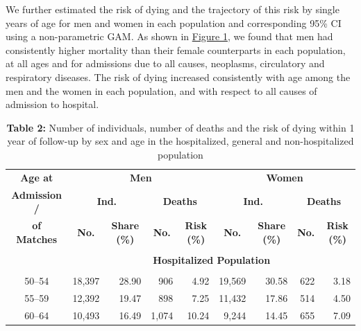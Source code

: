 We further estimated the risk of dying and the trajectory of this risk by 
single years of age for men and women in each population and corresponding 
95\% CI using a non-parametric GAM. As shown in \hyperref[ch2:fig1]{Figure 1}, 
we found that men had consistently higher mortality than their female counterparts 
in each population, at all ages and for admissions due to all causes, 
neoplasms, circulatory and respiratory diseases. The risk of dying increased 
consistently with age among the men and the women in each population, 
and with respect to all causes of admission to hospital.

\begin{landscape}

\begin{table}[H]
  \scriptsize
  \centering
  \caption*{\textbf{Table 2: }  Number of individuals, number of deaths 
  			and the risk of dying within 1 year of follow-up by sex and 
  			age in the hospitalized, general and non-hospitalized population}
    \begin{tabular}{ccccccccc}
    \toprule
    \textbf{Age at } & \multicolumn{4}{c}{\textbf{Men}} & \multicolumn{4}{c}{\textbf{Women}} \\
    \textbf{Admission /} & \multicolumn{2}{c}{\textbf{Ind.}} & \multicolumn{2}{c}{\textbf{Deaths}} & \multicolumn{2}{c}{\textbf{Ind.}} & \multicolumn{2}{c}{\textbf{Deaths}} \\
    \textbf{of Matches} & \textbf{No.} & \textbf{Share (\%)} & \textbf{No.} & \textbf{Risk (\%)} & \textbf{No.} & \textbf{Share (\%)} & \textbf{No.} & \textbf{Risk (\%)} \\
    \midrule
          &       &       &       &       &       &       &       &  \\
          & \multicolumn{8}{c}{\textbf{Hospitalized Population}} \\
          &       &       &       &       &       &       &       &  \\
    50--54 & \multicolumn{1}{r}{18,397} & \multicolumn{1}{r}{28.90} & \multicolumn{1}{r}{906} & \multicolumn{1}{r}{4.92} & \multicolumn{1}{r}{19,569} & \multicolumn{1}{r}{30.58} & \multicolumn{1}{r}{622} & \multicolumn{1}{r}{3.18} \\
    55--59 & \multicolumn{1}{r}{12,392} & \multicolumn{1}{r}{19.47} & \multicolumn{1}{r}{898} & \multicolumn{1}{r}{7.25} & \multicolumn{1}{r}{11,432} & \multicolumn{1}{r}{17.86} & \multicolumn{1}{r}{514} & \multicolumn{1}{r}{4.50} \\
    60--64 & \multicolumn{1}{r}{10,493} & \multicolumn{1}{r}{16.49} & \multicolumn{1}{r}{1,074} & \multicolumn{1}{r}{10.24} & \multicolumn{1}{r}{9,244} & \multicolumn{1}{r}{14.45} & \multicolumn{1}{r}{655} & \multicolumn{1}{r}{7.09} \\

\end{tabular}
\end{table}
\end{landscape}
